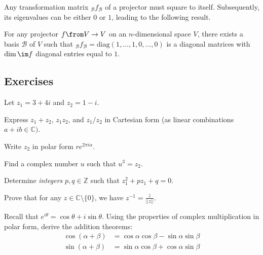 \documentclass[a4paper,oneside, 12pt]{amsart}
\begin{document}
Any transformation matrix \(_{\mathcal{B}}f_{\mathcal{B}}\) of a projector must square to itself.
Subsequently, its eigenvalues can be either \(0\) or \(1\), leading to the following result.
\begin{proposition}\label{prop:matrix-representation-of-projection}
  For any projector \(f\from V \to V\) on an \(n\)-dimensional space \(V\), there exists a basis \(\mathcal{B}\) of \(V\) such that \(_{\mathcal{B}}f_{\mathcal{B}} = \mathrm{diag}(1, \dots , 1, 0, \dots , 0)\) is a diagonal matrices with \(\dim \im f\) diagonal entries equal to \(1\).
\end{proposition}


\cleardoublepage
\subsection{Exercises}\label{sec:lin-alg-exercises}
\begin{exercise}
  Let \(z_1 = 3 + 4i\) and \(z_2 = 1 - i\).
  \begin{thmlist}
    \item Express \(z_1 + z_2\), \(z_1 z_2\), and \(z_1 / z_2\) in Cartesian form (\ie as linear combinations \(a + ib \in \mathbb{C})\).
    \item Write \(z_2\) in polar form \(re^{2\pi i \alpha}\).
    \item Find a complex number \(u\) such that \(u^{3}= z_{2}\).
    \item Determine \emph{integers} \(p,q \in \mathbb{Z}\) such that \(z_{1}^{2} + p z_{1} + q = 0\).
    \item Prove that for any \(z \in \mathbb{C}\setminus\{0\}\), we have \(z^{-1} = \tfrac{\overline{z}}{||z||}\).
  \end{thmlist}
\end{exercise}

\begin{exercise}
  Recall that \(e^{i\theta} = \cos\theta + i\sin\theta\).
  Using the properties of complex multiplication in polar form, derive the addition theorems:
  \begin{align*}
    \cos(\alpha + \beta) &= \cos\alpha \cos\beta - \sin\alpha \sin\beta \\
    \sin(\alpha + \beta) &= \sin\alpha \cos\beta + \cos\alpha \sin\beta
  \end{align*}
\end{exercise}
\end{document}
